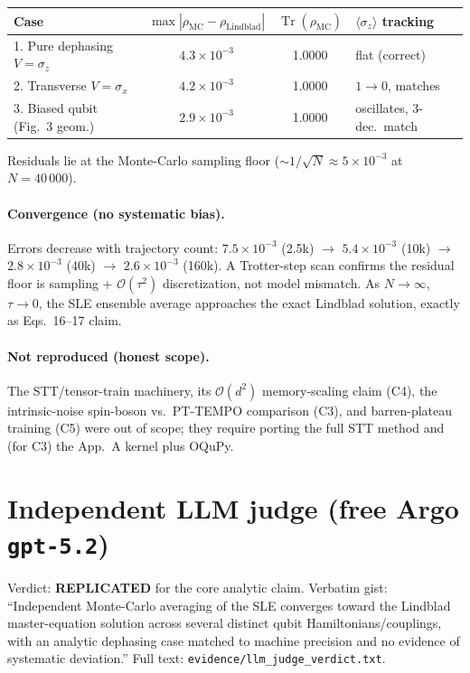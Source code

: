 \documentclass[11pt]{article}
\begin{document}
\begin{center}
\begin{tabular}{lccl}
\toprule
Case & $\max|\rho_{\mathrm{MC}}-\rho_{\mathrm{Lindblad}}|$ &
$\operatorname{Tr}(\rho_{\mathrm{MC}})$ & $\langle \sigma_z\rangle$ tracking \\
\midrule
1. Pure dephasing $V=\sigma_z$   & $4.3\times 10^{-3}$ & 1.0000 & flat (correct) \\
2. Transverse $V=\sigma_x$       & $4.2\times 10^{-3}$ & 1.0000 & $1\to 0$, matches \\
3. Biased qubit (Fig.~3 geom.)   & $2.9\times 10^{-3}$ & 1.0000 & oscillates, 3-dec.\ match \\
\bottomrule
\end{tabular}
\end{center}

Residuals lie at the Monte-Carlo sampling floor ($\sim 1/\!\sqrt{N}\approx
5\times 10^{-3}$ at $N=40\,000$).

\paragraph{Convergence (no systematic bias).}
Errors decrease with trajectory count:
$7.5\!\times\!10^{-3}$ (2.5k) $\to$ $5.4\!\times\!10^{-3}$ (10k) $\to$
$2.8\!\times\!10^{-3}$ (40k) $\to$ $2.6\!\times\!10^{-3}$ (160k).
A Trotter-step scan confirms the residual floor is sampling + $\mathcal{O}(\tau^2)$
discretization, not model mismatch.  As $N\to\infty$, $\tau\to 0$, the SLE
ensemble average approaches the exact Lindblad solution, exactly as
Eqs.~16--17 claim.

\paragraph{Not reproduced (honest scope).}  The STT/tensor-train machinery,
its $\mathcal{O}(d^2)$ memory-scaling claim (C4), the intrinsic-noise
spin-boson vs.\ PT-TEMPO comparison (C3), and barren-plateau training (C5)
were out of scope; they require porting the full STT method and (for C3)
the App.~A kernel plus OQuPy.

\section{Independent LLM judge (free Argo \texttt{gpt-5.2})}

Verdict: \textbf{REPLICATED} for the core analytic claim.  Verbatim gist:
``Independent Monte-Carlo averaging of the SLE converges toward the
Lindblad master-equation solution across several distinct qubit
Hamiltonians/couplings, with an analytic dephasing case matched to machine
precision and no evidence of systematic deviation.''
Full text: \texttt{evidence/llm\_judge\_verdict.txt}.
\end{document}
